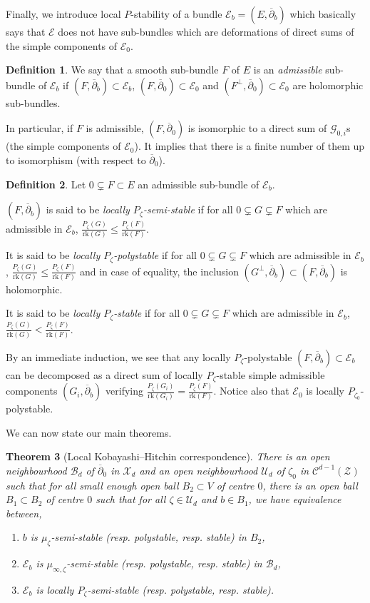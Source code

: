 \documentclass{article}
\newtheorem{theorem}{Theorem}[section]
\theoremstyle{remark}
\theoremstyle{definition}
\newtheorem{definition}[theorem]{Definition}
\newcommand{\rk}{\mathrm{rk}}
\newcommand{\E}{\mathcal{E}}
\newcommand{\G}{\mathcal{G}}
\newcommand{\mB}{\mathcal{B}}
\newcommand{\mC}{\mathcal{C}}
\newcommand{\mX}{\mathcal{X}}
\newcommand{\mZ}{\mathcal{Z}}
\newcommand{\mU}{\mathcal{U}}
\newcommand{\dbar}{\overline{\partial}}
\renewcommand{\leq}{\leqslant}
\begin{document}
Finally, we introduce local $P$-stability of a bundle $\E_b = (E,\dbar_b)$ which basically says that $\E$ does not have sub-bundles which are deformations of direct sums of the simple components of $\E_0$.
\begin{definition}
    We say that a smooth sub-bundle $F$ of $E$ is an \textit{admissible} sub-bundle of $\E_b$ if $(F,\dbar_b) \subset \E_b$, $(F,\dbar_0) \subset \E_0$ and $(F^\bot,\dbar_0) \subset \E_0$ are holomorphic sub-bundles.
\end{definition}
In particular, if $F$ is admissible, $(F,\dbar_0)$ is isomorphic to a direct sum of $\G_{0,i}$s (the simple components of $\E_0$). It implies that there is a finite number of them up to isomorphism (with respect to $\dbar_0$).
\begin{definition}\label{DEF:Stabilité P}
    Let $0 \subsetneq F \subset E$ an admissible sub-bundle of $\E_b$.
    
    $(F,\dbar_b)$ is said to be \textit{locally $P_\zeta$-semi-stable} if for all $0 \subsetneq G \subsetneq F$ which are admissible in $\E_b$, $\frac{P_\zeta(G)}{\rk(G)} \leq \frac{P_\zeta(F)}{\rk(F)}$.
    
    It is said to be \textit{locally $P_\zeta$-polystable} if for all $0 \subsetneq G \subsetneq F$ which are admissible in $\E_b$, $\frac{P_\zeta(G)}{\rk(G)} \leq \frac{P_\zeta(F)}{\rk(F)}$ and in case of equality, the inclusion $(G^\bot,\dbar_b) \subset (F,\dbar_b)$ is holomorphic.
    
    It is said to be \textit{locally $P_\zeta$-stable} if for all $0 \subsetneq G \subsetneq F$ which are admissible in $\E_b$, $\frac{P_\zeta(G)}{\rk(G)} < \frac{P_\zeta(F)}{\rk(F)}$.
\end{definition}
By an immediate induction, we see that any locally $P_\zeta$-polystable $(F,\dbar_b) \subset \E_b$ can be decomposed as a direct sum of locally $P_\zeta$-stable simple admissible components $(G_i,\dbar_b)$ verifying $\frac{P_\zeta(G_i)}{\rk(G_i)} = \frac{P_\zeta(F)}{\rk(F)}$. Notice also that $\E_0$ is locally $P_{\zeta_0}$-polystable.

We can now state our main theorems.

\begin{theorem}[Local Kobayashi--Hitchin correspondence]\label{THE:Déformation P-critique}
    There is an open neighbourhood $\mB_d$ of $\dbar_0$ in $\mX_d$ and an open neighbourhood $\mU_d$ of $\zeta_0$ in $\mC^{d - 1}(\mZ)$ such that for all small enough open ball $B_2 \subset V$ of centre $0$, there is an open ball $B_1 \subset B_2$ of centre $0$ such that for all $\zeta \in \mU_d$ and $b \in B_1$, we have equivalence between,
    \begin{enumerate}
        \item $b$ is $\mu_\zeta$-semi-stable (resp. polystable, resp. stable) in $B_2$,
        \item $\E_b$ is $\mu_{\infty,\zeta}$-semi-stable (resp. polystable, resp. stable) in $\mB_d$,
        \item $\E_b$ is locally $P_\zeta$-semi-stable (resp. polystable, resp. stable).
    \end{enumerate}
\end{theorem}
\end{document}
